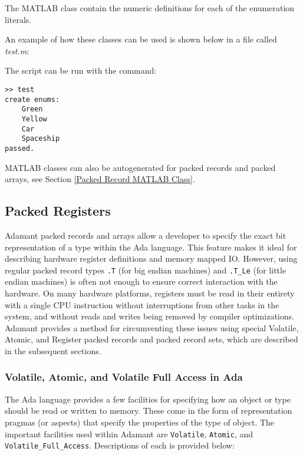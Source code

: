 The MATLAB class contain the numeric definitions for each of the enumeration literals.

An example of how these classes can be used is shown below in a file called \textit{test.m}:


The script can be run with the command:

\vspace{5mm} %
\begin{verbatim}
>> test
create enums:
    Green
    Yellow
    Car
    Spaceship
passed.
\end{verbatim}
\vspace{5mm} %

MATLAB classes can also be autogenerated for packed records and packed arrays, see Section \ref{Packed Record MATLAB Class}.

\subsection{Packed Registers}

Adamant packed records and arrays allow a developer to specify the exact bit representation of a type within the Ada language. This feature makes it ideal for describing hardware register definitions and memory mapped IO. However, using regular packed record types \texttt{.T} (for big endian machines) and \texttt{.T\_Le} (for little endian machines) is often not enough to ensure correct interaction with the hardware. On many hardware platforms, registers must be read in their entirety with a single CPU instruction without interruptions from other tasks in the system, and without reads and writes being removed by compiler optimizations. Adamant provides a method for circumventing these issues using special Volatile, Atomic, and Register packed records and packed record sets, which are described in the subsequent sections.

\subsubsection{Volatile, Atomic, and Volatile Full Access in Ada}

The Ada language provides a few facilities for specifying how an object or type should be read or written to memory. These come in the form of representation pragmas (or aspects) that specify the properties of the type of object. The important facilities used within Adamant are \texttt{Volatile}, \texttt{Atomic}, and \texttt{Volatile\_Full\_Access}. Descriptions of each is provided below:

